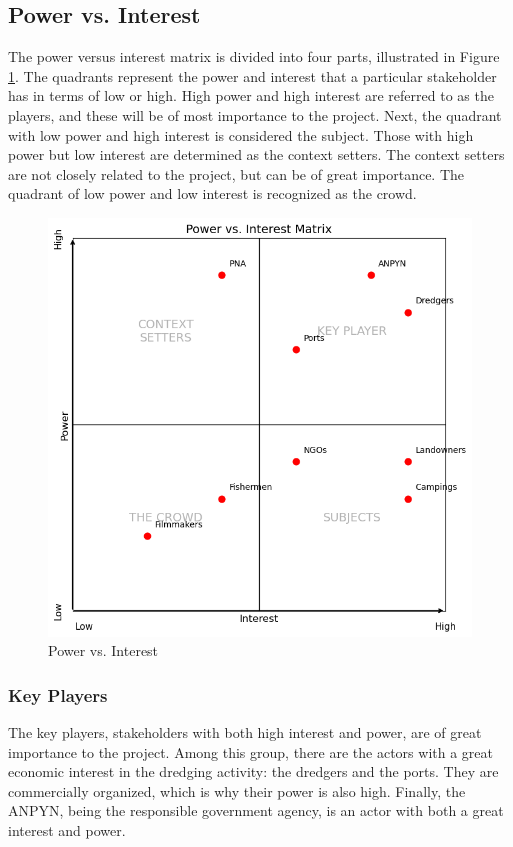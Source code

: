 \subsection{Power vs. Interest}

The power versus interest matrix is divided into four parts, illustrated in Figure \ref{fig:power-interest}. The quadrants represent the power and interest that a particular stakeholder has in terms of low or high. High power and high interest are referred to as the players, and these will be of most importance to the project. Next, the quadrant with low power and high interest is considered the subject. Those with high power but low interest are determined as the context setters. The context setters are not closely related to the project, but can be of great importance. The quadrant of low power and low interest is recognized as the crowd.

\begin{figure}[H]
    \centering
    \includegraphics[width=0.70\linewidth]{figures/PowerVSInterest.png}
    \caption{Power vs. Interest}
    \label{fig:power-interest}
\end{figure}

\subsubsection{Key Players}
The key players, stakeholders with both high interest and power, are of great importance to the project. Among this group, there are the actors with a great economic interest in the dredging activity: the dredgers and the ports. They are commercially organized, which is why their power is also high. Finally, the ANPYN, being the responsible government agency, is an actor with both a great interest and power.

